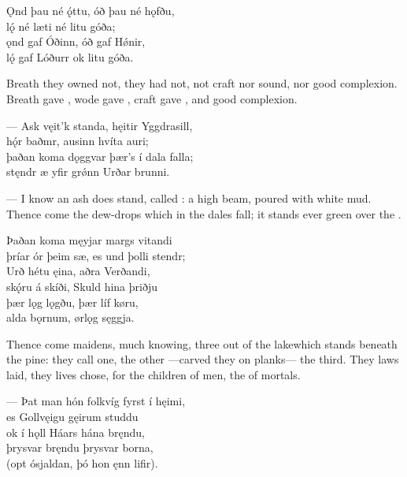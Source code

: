 \bva Ǫnd þau né ǫ́ttu, \hld óð þau né hǫfðu, \\%
lǫ́ né læti \hld né litu góða; \\%
ǫnd gaf Óðinn, \hld óð gaf Hǿnir, \\%
lǫ́ gaf Lóðurr \hld ok litu góða.\eva

\bvb Breath they owned not,  they had not, not craft nor sound, nor good complexion. Breath gave , wode gave , craft gave , and good complexion.\evb


\bva — Ask vęit’k standa, \hld hęitir Yggdrasill, \\%
hǫ́r baðmr, ausinn \hld hvíta auri; \\%
þaðan koma dǫggvar \hld þær’s í dala falla; \\%
stęndr æ yfir grǿnn \hld Urðar brunni.\eva

\bvb — I know an ash does stand, called : a high beam\footnotemark[1], poured with white mud\footnotemark[2]. Thence come the dew-drops which in the dales fall; it stands ever green over the .\evb
{}

\bva Þaðan koma męyjar \hld margs vitandi \\%
þríar ór þeim sæ\footnotemark[1], \hld es und þolli stendr; \\%
Urð hétu ęina, \hld aðra Verðandi, \\%
skǫ́ru á skíði, \hld Skuld hina þriðju \\%
þær lǫg lǫgðu, \hld þær líf køru, \\%
alda bǫrnum, \hld ørlǫg sęggja.\eva
{}

\bvb Thence come maidens, much knowing, three out of the lake\footnotemark[1] which stands beneath the pine\footnotemark[2]:  they call one, the other —carved they on planks— the third. They laws laid, they lives chose, for the children of men, the  of mortals.\evb
{}


\bva — Þat man hón folkvíg \hld fyrst í hęimi, \\%
es Gollvęigu \hld gęirum studdu \\%
ok í hǫll Háars \hld hána bręndu, \\%
þrysvar bręndu \hld þrysvar borna, \\%
(opt ósjaldan, \hld þó hon ęnn lifir).\footnotemark[1]\eva
{}

